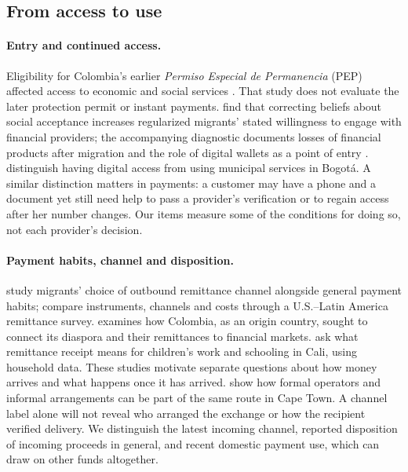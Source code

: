 \subsection{From access to use}
\paragraph{Entry and continued access.}
Eligibility for Colombia's earlier \emph{Permiso Especial de Permanencia} (PEP) affected access to economic and social services \citep{ibanez2025}. That study does not evaluate the later protection permit or instant payments. \citet{barboni2025} find that correcting beliefs about social acceptance increases regularized migrants' stated willingness to engage with financial providers; the accompanying diagnostic documents losses of financial products after migration and the role of digital wallets as a point of entry \citep{ipaMigrantsDiagnostic}. \citet{martinshields2022} distinguish having digital access from using municipal services in Bogotá. A similar distinction matters in payments: a customer may have a phone and a document yet still need help to pass a provider's verification or to regain access after her number changes. Our items measure some of the conditions for doing so, not each provider's decision.

\paragraph{Payment habits, channel and disposition.}
\citet{kosseVermeulen2014} study migrants' choice of outbound remittance channel alongside general payment habits; \citet{martinRemittanceJourney2019} compare instruments, channels and costs through a U.S.--Latin America remittance survey. \citet{zapata_diaspora_2022} examines how Colombia, as an origin country, sought to connect its diaspora and their remittances to financial markets. \citet{cuadros_verified_2020} ask what remittance receipt means for children's work and schooling in Cali, using household data. These studies motivate separate questions about how money arrives and what happens once it has arrived. \citet{cirolia_remittance_2022} show how formal operators and informal arrangements can be part of the same route in Cape Town. A channel label alone will not reveal who arranged the exchange or how the recipient verified delivery. We distinguish the latest incoming channel, reported disposition of incoming proceeds in general, and recent domestic payment use, which can draw on other funds altogether.

